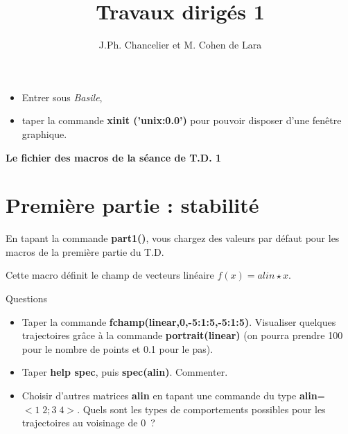 

\textheight=660pt 
\textwidth=470pt 
\topmargin=-27pt 
\oddsidemargin=0pt 
\evensidemargin=0pt 
\def\cmarg{\hspace{1cm}}
\title{Travaux dirig\'es 1}
\author{J.Ph. Chancelier et M. Cohen de Lara}


\maketitle
\vspace{2cm}

\begin{itemize}
\item Entrer sous {\em Basile},
\item taper la commande {\bf xinit ('unix:0.0')} pour pouvoir disposer
d'une fen\^etre graphique.
 \end{itemize}

\centerline{{\bf Le fichier des macros de la s\'eance de T.D. 1}}

\def\tit#1{ \begin{center} \fbox{{\bf  #1}} \end{center}}



\Mhlp

\section{Premi\`ere partie : stabilit\'e}
\tit{part1}

En tapant la commande {\bf part1()}, vous chargez des valeurs par d\'efaut
pour les macros de la premi\`ere partie du T.D.
\medskip

\Mpartu

\tit{linear}

Cette macro d\'efinit le champ de vecteurs lin\'eaire $f(x) = alin \star x$.
\medskip

\Mlinear

\centerline{{\sc Questions}}

\begin{itemize}
\item Taper la commande {\bf fchamp(linear,0,-5:1:5,-5:1:5)}. 
Visualiser quelques trajectoires gr\^ace \`a la commande {\bf portrait(linear)} (on pourra prendre 100 pour le nombre de points et 0.1 pour le pas).
\item Taper {\bf help spec}, puis {\bf spec(alin)}. Commenter.
\item Choisir d'autres matrices {\bf alin} en tapant une commande du
type  {\bf alin}= $<1 \;  2;3 \;  4>$. Quels sont les types de comportements
possibles pour les trajectoires au voisinage de 0~?
\end{itemize}

